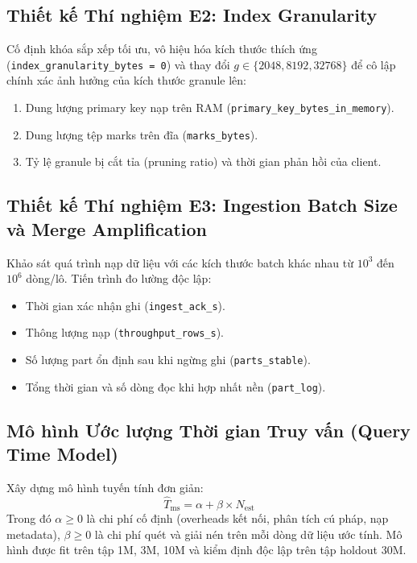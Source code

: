 \subsection{Thiết kế Thí nghiệm E2: Index Granularity}
Cố định khóa sắp xếp tối ưu, vô hiệu hóa kích thước thích ứng (\texttt{index\_granularity\_bytes = 0}) và thay đổi $g \in \{2048, 8192, 32768\}$ để cô lập chính xác ảnh hưởng của kích thước granule lên:
\begin{enumerate}
    \item Dung lượng primary key nạp trên RAM (\texttt{primary\_key\_bytes\_in\_memory}).
    \item Dung lượng tệp marks trên đĩa (\texttt{marks\_bytes}).
    \item Tỷ lệ granule bị cắt tỉa (pruning ratio) và thời gian phản hồi của client.
\end{enumerate}

\subsection{Thiết kế Thí nghiệm E3: Ingestion Batch Size và Merge Amplification}
Khảo sát quá trình nạp dữ liệu với các kích thước batch khác nhau từ $10^3$ đến $10^6$ dòng/lô. Tiến trình đo lường độc lập:
\begin{itemize}
    \item Thời gian xác nhận ghi (\texttt{ingest\_ack\_s}).
    \item Thông lượng nạp (\texttt{throughput\_rows\_s}).
    \item Số lượng part ổn định sau khi ngừng ghi (\texttt{parts\_stable}).
    \item Tổng thời gian và số dòng đọc khi hợp nhất nền (\texttt{part\_log}).
\end{itemize}

\subsection{Mô hình Ước lượng Thời gian Truy vấn (Query Time Model)}
Xây dựng mô hình tuyến tính đơn giản:
\begin{equation}
    \hat{T}_{\text{ms}} = \alpha + \beta \times N_{\text{est}}
\end{equation}
Trong đó $\alpha \ge 0$ là chi phí cố định (overheads kết nối, phân tích cú pháp, nạp metadata), $\beta \ge 0$ là chi phí quét và giải nén trên mỗi dòng dữ liệu ước tính. Mô hình được fit trên tập 1M, 3M, 10M và kiểm định độc lập trên tập holdout 30M.
